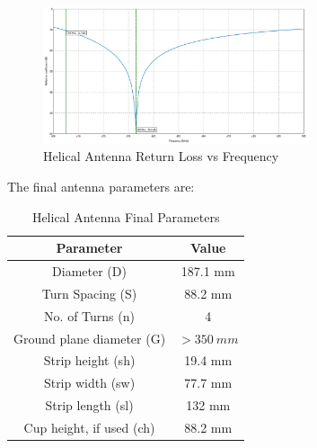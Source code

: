 \begin{figure}[!htb]
  \centering
  \includegraphics[width=0.7\textwidth]{helix7_returnLoss}
  \caption{Helical Antenna Return Loss vs Frequency}
  \label{fig:helix7_returnLoss}
\end{figure}

The final antenna parameters are:
\begin{table}[!htb]
  \centering
  \renewcommand{\arraystretch}{1.2}
  \begin{tabular}{ |c|c| }
  \hline
  \textbf{Parameter}                  & \textbf{Value}    \\
  \hline
  Diameter (D)                        & 187.1 mm          \\ \hline
  Turn Spacing (S)                    & 88.2 mm           \\ \hline
  No. of Turns (n)                    & 4                 \\ \hline
  Ground plane diameter (G)           & $> \SI{350}{mm}$  \\ \hline
  Strip height (sh)                   & 19.4 mm          \\ \hline
  Strip width (sw)                    & 77.7 mm           \\ \hline
  Strip length (sl)                   & 132 mm           \\ \hline
  Cup height, if used (ch)            & 88.2 mm           \\ \hline
  \end{tabular}
  \caption{Helical Antenna Final Parameters}
  \label{tab:helicalParameters}
\end{table}